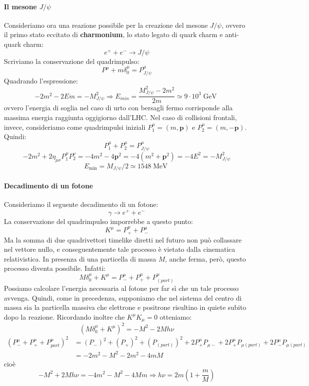 \documentclass[a4paper,11pt]{book}
\theoremstyle{plain}
\theoremstyle{definition}
\DeclareMathOperator*{\mev}{MeV}
\DeclareMathOperator*{\gev}{GeV}
\begin{document}
\paragraph{Il mesone $J/\psi$}
Consideriamo ora una reazione possibile per la creazione del mesone $J/\psi$, ovvero il primo stato eccitato di \textbf{charmonium}, lo stato legato di quark charm e anti-quark charm:
\[
e^++e^-\to J/\psi
\]
Scriviamo la conservazione del quadrimpulso:
\[
P^{\mu}+m\delta_0^{\mu}=P^{\mu}_{J/\psi}
\]
Quadrando l'espressione:
\[
-2m^2-2Em=-M^2_{J/\psi} \Rightarrow E_{min}=\frac{M^2_{J/\psi}-2m^2}{2m}\simeq 9\cdot 10^3 \gev
\]
ovvero l'energia di soglia nel caso di urto con bersagli fermo corrisponde alla massima energia raggiunta oggigiorno dall'LHC. Nel caso di collisioni frontali, invece, consideriamo come quadrimpulsi iniziali $P^{\mu}_1=(m,\textbf{p})$ e $P^{\mu}_2=(m,-\textbf{p})$. Quindi:
\[
P^{\mu}_1+P^{\mu}_2=P^{\mu}_{J/\psi}
\]
\[
-2m^2+2\eta_{\mu\nu}P_1^{\mu}P_2^{\nu}=-4m^2-4\textbf{p}^2=-4(m^2+\textbf{p}^2)=-4E^2=-M^2_{J/\psi}
\]
\[
E_{\min}=M_{J/\psi}/2\simeq 1548\mev
\]
\paragraph{Decadimento di un fotone}
Consideriamo il seguente decadimento di un fotone:
\[
\gamma \to e^++e^-
\]
La conservazione del quadrimpulso imporrebbe a questo punto:
\[
K^{\mu}=P^{\mu}_++P^{\mu}_-
\]
Ma la somma di due quadrivettori timelike diretti nel futuro non può collassare nel vettore nullo, e conseguentemente tale processo è vietato dalla cinematica relativistica. In presenza di una particella di massa $M$, anche ferma, però, questo processo diventa possibile. Infatti:
\[
M\delta_0^{\mu}+K^{\mu}=P^{\mu}_-+P^{\mu}_++P^{\mu}_{(part)}
\]
Possiamo calcolare l'energia necessaria al fotone per far sì che un tale processo avvenga. Quindi, come in precedenza, supponiamo che nel sistema del centro di massa sia la particella massiva che elettrone e positrone risultino in quiete subito dopo la reazione. Ricordando inoltre che $K^{\mu}K_{\mu}=0$ otteniamo:
\[
(M\delta_0^{\mu}+K^{\mu})^2= -M^2-2Mh\nu
\]
\begin{align*}
(P^{\mu}_- + P^{\mu}_+ + P^{\mu}_{part})^2&=(P_-)^2+(P_+)^2+(P_{(part)})^2+2P^{\mu}_+P_{\mu-}+2P^{\mu}_+P_{\mu(part)}+2P^{\mu}_-P_{\mu(part)}\\
&=-2m^2-M^2-2m^2-4mM
\end{align*}
cioè
\[
-M^2+2Mh\nu=-4m^2-M^2-4Mm \Rightarrow h\nu=2m\left( 1+\frac{m}{M} \right)
\]
\end{document}
